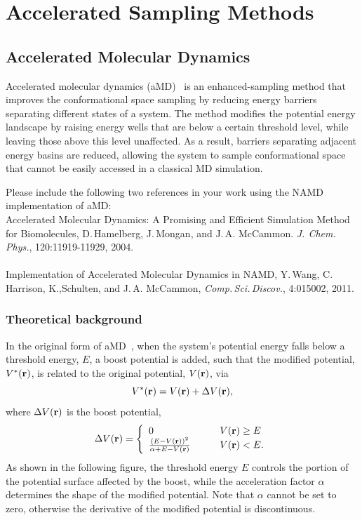 \section{Accelerated Sampling Methods}
\label{section:accel}

\subsection{Accelerated Molecular Dynamics}
\label{section:accelmd}
Accelerated molecular dynamics (aMD)~\cite{HAME2004mc} is an enhanced-sampling method that
improves the conformational space sampling by 
reducing energy barriers separating different states of a system.
The method modifies the potential 
energy landscape by raising energy wells that are below
a certain threshold level, while leaving those above this level unaffected.
As a result, barriers separating adjacent energy basins are reduced, allowing the system to sample
conformational space that cannot be easily accessed in a classical MD simulation.

Please include the following two references in your work using the NAMD implementation of aMD:
\\
Accelerated Molecular Dynamics: A Promising and Efficient Simulation Method for Biomolecules, D.\,Hamelberg, 
J.\,Mongan, and J.\,A. McCammon. {\it J. Chem. Phys.}, 120:11919-11929, 2004.
\\
\\
Implementation of Accelerated Molecular Dynamics in NAMD, Y.\,Wang, C.\,Harrison, 
K.,Schulten, and J.\,A. McCammon, {\it Comp.\,Sci.\,Discov.}, 4:015002, 2011.
\subsubsection{Theoretical background}
In the original form of aMD~\cite{HAME2004mc}, when the system's potential energy falls       
below a threshold energy, $E$, a boost potential is added, 
such that the modified potential, $V^*({\bf r})$, is related to the original
potential, $V({\bf r})$, via
\begin{equation}
V^*({\bf r})= V({\bf r}) + \Delta V({\bf r}),
\end{equation}
where $\Delta V({\bf r})$ is the boost potential, 
\begin{equation} 
\Delta V({\bf r})= \left \{
\begin{array}{l l}
0   & \quad \quad V({\bf r})\geq E \\  
\frac{(E-V({\bf r}))^2}{\alpha+E-V({\bf r})}  & \quad \quad V({\bf r})<E. \\
\end{array} \right. 
\end{equation}
As shown in the following figure, the threshold energy $E$ controls the portion of 
the potential surface affected by the boost, while the acceleration factor 
$\alpha$ determines the shape of the modified potential.
Note that $\alpha$ cannot be set to zero, otherwise the derivative of the modified potential
is discontinuous.

